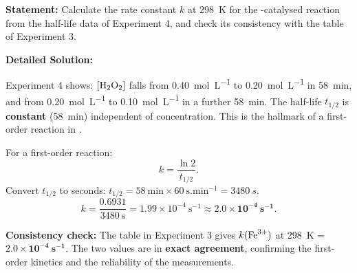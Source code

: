 \documentclass[11pt]{article}
\newcommand{\cle}[1]{{\popxbold\color{popdark}#1}}
\begin{document}
\begin{exoresolu}
\textbf{Statement:} Calculate the rate constant $k$ at \SI{298}{K} for the -catalysed reaction from the half-life data of Experiment 4, and check its consistency with the table of Experiment 3.

\tcblower
\textbf{Detailed Solution:}

Experiment 4 shows: $[\ce{H2O2}]$ falls from \SI{0.40}{mol.L^{-1}} to \SI{0.20}{mol.L^{-1}} in \SI{58}{min}, and from \SI{0.20}{mol.L^{-1}} to \SI{0.10}{mol.L^{-1}} in a further \SI{58}{min}.
The half-life $t_{1/2}$ is \textbf{constant} (\SI{58}{min}) independent of concentration. This is the hallmark of a \cle{first-order} reaction in .

For a first-order reaction:
\[
k = \frac{\ln 2}{t_{1/2}}.
\]
Convert $t_{1/2}$ to seconds: $t_{1/2} = 58\ \mathrm{min} \times 60\ \mathrm{s.min^{-1}} = \SI{3480}{s}$.
\[
k = \frac{0.6931}{3480\ \mathrm{s}} = 1.99 \times 10^{-4}\ \mathrm{s^{-1}} \approx \mathbf{2.0 \times 10^{-4}\ \si{s^{-1}}}.
\]

\textbf{Consistency check:} The table in Experiment 3 gives $k(\ce{Fe^{3+}})$ at \SI{298}{K} = $\mathbf{2.0 \times 10^{-4}\ \si{s^{-1}}}$. The two values are in \textbf{exact agreement}, confirming the first-order kinetics and the reliability of the measurements.
\end{exoresolu}
\end{document}
